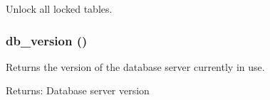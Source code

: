 Unlock all locked tables. \hypertarget{database_8mysql_8inc_6736a6897048ff0167a0bbe5e374fc13}{
\subsubsection[{db\_\-version}]{\setlength{\rightskip}{0pt plus 5cm}db\_\-version ()}}
\label{database_8mysql_8inc_6736a6897048ff0167a0bbe5e374fc13}


Returns the version of the database server currently in use.

\begin{Desc}
\item[Returns:]Database server version \end{Desc}

